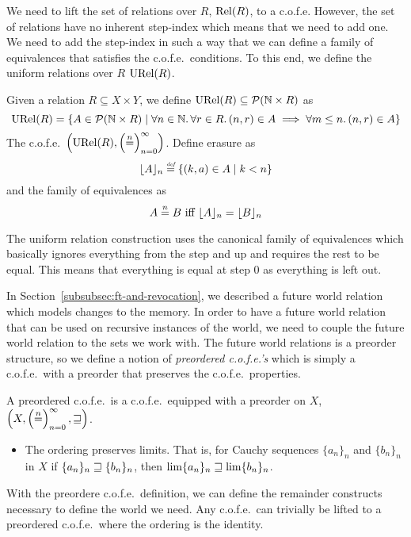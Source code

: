 \begin{jversion}
We need to lift the set of relations over $R$, $\mathrm{Rel}(R)$, to a c.o.f.e.
However, the set of relations have no inherent step-index which means that we need to add one.
We need to add the step-index in such a way that we can define a family of equivalences that satisfies the c.o.f.e.\ conditions.
To this end, we define the uniform relations over $R$ $\mathrm{URel}(R)$.
\begin{definition}
  Given a relation $R \subseteq X \times Y$, we define $\mathrm{URel}(R) \subseteq \mathcal{P}(\mathbb{N} \times R)$ as
  \[
    \mathrm{URel}(R) = \{ A \in \mathcal{P}(\mathbb{N} \times R) \mid \forall n \in \mathbb{N}\ldotp \forall r \in R \ldotp \left(n,r\right) \in A \implies \forall m \leq n \ldotp (n,r) \in A\}
  \]
  The c.o.f.e.\ $\left(\mathrm{URel}(R),\left(\overset{n}{=}\right)_{n=0}^{\infty} \right)$. Define erasure as
  \[
    \lfloor A \rfloor_{n} \stackrel{\textit{\tiny{def}}}{=} \{(k,a) \in A \mid k < n\}
  \]
  and the family of equivalences as
  \[
    A \overset{n}{=} B \text{ iff } \lfloor A \rfloor_{n} = \lfloor B \rfloor_{n}
  \]
\end{definition}
The uniform relation construction uses the canonical family of equivalences which basically ignores everything from the step and up and requires the rest to be equal.
This means that everything is equal at step $0$ as everything is left out.

In Section~\ref{subsubsec:ft-and-revocation}, we described a future world relation which models changes to the memory.
In order to have a future world relation that can be used on recursive instances of the world, we need to couple the future world relation to the sets we work with.
The future world relations is a preorder structure, so we define a notion of \emph{preordered c.o.f.e.'s} which is simply a c.o.f.e.\ with a preorder that preserves the c.o.f.e.\ properties.
\begin{definition}[Preordered c.o.f.e.]
  A preordered c.o.f.e.\ is a c.o.f.e.\ equipped with a preorder on $X$, $\left(X, \left(\overset{n}{=}\right)_{n=0}^{\infty}, \sqsupseteq \right)$. 
  \begin{itemize}
  \item The ordering preserves limits. That is, for Cauchy sequences $\{a_n\}_n$ and $\{b_n\}_n$ in $X$ if $\{a_n\}_n \sqsupseteq\{b_n\}_n$, then $\lim \{a_n\}_n \sqsupseteq \lim \{b_n\}_n$.
  \end{itemize}
\end{definition}
With the preordere c.o.f.e.\ definition, we can define the remainder constructs necessary to define the world we need. Any c.o.f.e.\ can trivially be lifted to a preordered c.o.f.e.\ where the ordering is the identity.


\end{jversion}
